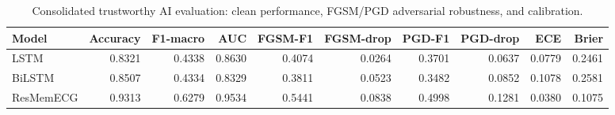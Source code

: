 \begin{table}[h!]
\centering
\caption{Consolidated trustworthy AI evaluation: clean performance, FGSM/PGD adversarial robustness, and calibration.}
\label{tab:consolidated}
\begin{tabular}{lrrrrrrrrr}
\toprule
Model & Accuracy & F1-macro & AUC & FGSM-F1 & FGSM-drop & PGD-F1 & PGD-drop & ECE & Brier \\
\midrule
LSTM & 0.8321 & 0.4338 & 0.8630 & 0.4074 & 0.0264 & 0.3701 & 0.0637 & 0.0779 & 0.2461 \\
BiLSTM & 0.8507 & 0.4334 & 0.8329 & 0.3811 & 0.0523 & 0.3482 & 0.0852 & 0.1078 & 0.2581 \\
ResMemECG & 0.9313 & 0.6279 & 0.9534 & 0.5441 & 0.0838 & 0.4998 & 0.1281 & 0.0380 & 0.1075 \\
\bottomrule
\end{tabular}
\end{table}